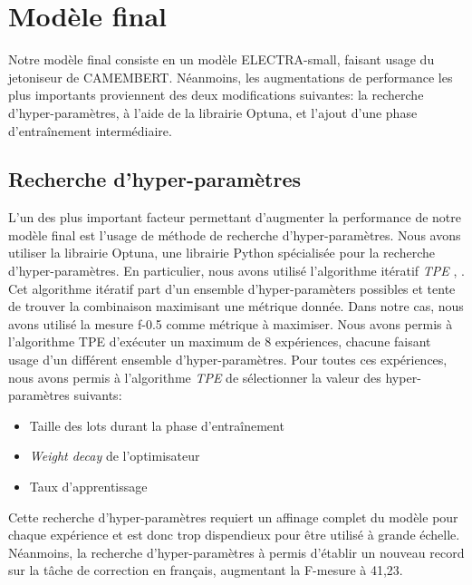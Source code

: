 \documentclass[12pt,twoside,maitrise]{dms}
\theoremstyle{definition}
\numberwithin{equation}{section}
\numberwithin{table}{chapter}
\numberwithin{figure}{chapter}
\begin{document}



\chapter{Modèle final}
Notre modèle final consiste en un modèle ELECTRA-small, faisant usage
du jetoniseur de CAMEMBERT. Néanmoins, les augmentations de
performance les plus importants proviennent des deux modifications
suivantes: la recherche d'hyper-paramètres, à l'aide de la librairie
Optuna, et l'ajout d'une phase d'entraînement intermédiaire.
\section{Recherche d'hyper-paramètres}
L'un des plus important facteur permettant d'augmenter la performance
de notre modèle final est l'usage de méthode de recherche
d'hyper-paramètres. Nous avons utiliser la librairie Optuna, une
librairie Python spécialisée pour la recherche d'hyper-paramètres. En
particulier, nous avons utilisé l'algorithme itératif \textit{TPE}
\cite{watanabe2023treestructuredparzenestimatorunderstanding},
\cite{NIPS2011_86e8f7ab}. Cet algorithme itératif part d'un ensemble
d'hyper-paramèters possibles et tente de trouver la combinaison
maximisant une métrique donnée. Dans notre cas, nous avons utilisé la
mesure f-0.5 comme métrique à maximiser. Nous avons permis à
l'algorithme TPE d'exécuter un maximum de 8 expériences, chacune
faisant usage d'un différent ensemble d'hyper-paramètres. Pour toutes
ces expériences, nous avons permis à l'algorithme \textit{TPE} de
sélectionner la valeur des hyper-paramètres suivants:
\begin{itemize}
	\item Taille des lots durant la phase d'entraînement
	\item \textit{Weight decay} de l'optimisateur
	\item Taux d'apprentissage
\end{itemize}

Cette recherche d'hyper-paramètres requiert un affinage complet du
modèle pour chaque expérience et est donc trop dispendieux pour être
utilisé à grande échelle. Néanmoins, la recherche d'hyper-paramètres à
permis d'établir un nouveau record sur la tâche de correction en
français, augmentant la F-mesure à 41,23.
\end{document}
